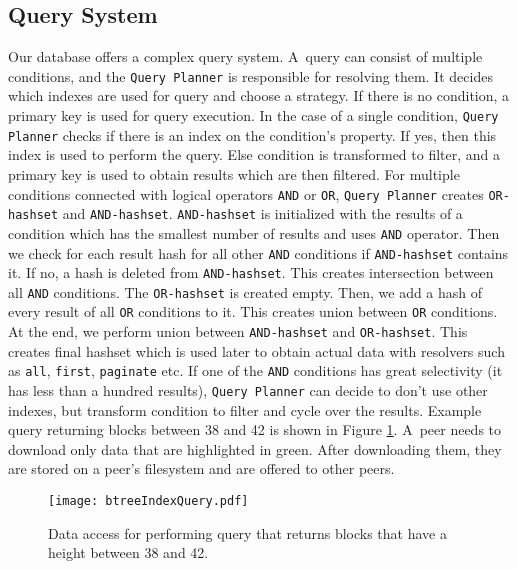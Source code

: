 \subsection{Query System}
Our database offers a complex query system. A~query can consist of multiple conditions, and the \texttt{Query Planner} is responsible for resolving them. It decides which indexes are used for query and choose a strategy. If there is no condition, a primary key is used for query execution. In the case of a single condition, \texttt{Query Planner} checks if there is an index on the condition's property. If yes, then this index is used to perform the query. Else condition is transformed to filter, and a primary key is used to obtain results which are then filtered. For multiple conditions connected with logical operators \texttt{AND} or \texttt{OR}, \texttt{Query Planner} creates \texttt{OR-hashset} and \texttt{AND-hashset}. \texttt{AND-hashset} is initialized with the results of a condition which has the smallest number of results and uses \texttt{AND} operator. Then we check for each result hash for all other \texttt{AND} conditions if \texttt{AND-hashset} contains it. If no, a hash is deleted from \texttt{AND-hashset}. This creates intersection between all \texttt{AND} conditions. The \texttt{OR-hashset} is created empty. Then, we add a hash of every result of all \texttt{OR} conditions to it. This creates union between \texttt{OR} conditions. At the end, we perform union between \texttt{AND-hashset} and \texttt{OR-hashset}. This creates final hashset which is used later to obtain actual data with resolvers such as \texttt{all}, \texttt{first}, \texttt{paginate} etc. If one of the \texttt{AND} conditions has great selectivity (it has less than a hundred results), \texttt{Query Planner} can decide to don't use other indexes, but transform condition to filter and cycle over the results. Example query returning blocks between 38 and 42 is shown in Figure \ref{btreeQuery}. A~peer needs to download only data that are highlighted in green. After downloading them, they are stored on a peer's filesystem and are offered to other peers. 

\begin{figure}[h]
    \centering
    \texttt{[image: btreeIndexQuery.pdf]}
    \caption{Data access for performing query that returns blocks that have a height between 38 and 42.}
    \label{btreeQuery}
\end{figure}


